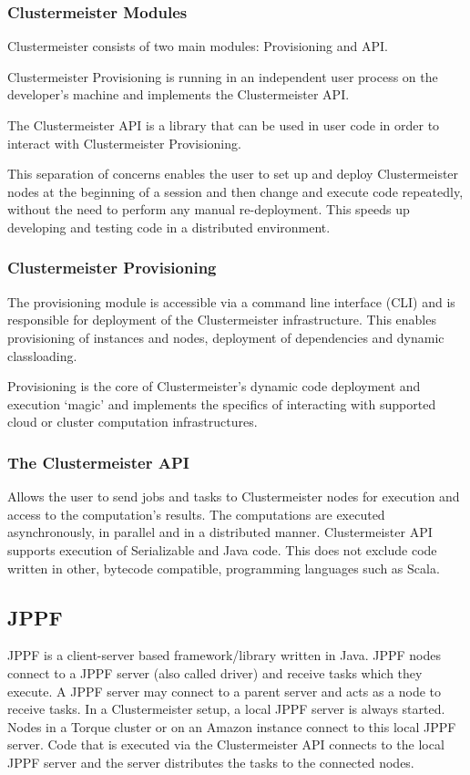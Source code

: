 \documentclass[english]{uzhpub}
\begin{document}
\subsubsection{Clustermeister Modules}

Clustermeister consists of two main modules: Provisioning and API.

Clustermeister Provisioning is running in an independent user process on the developer's machine and implements the Clustermeister API.

The Clustermeister API is a library that can be used in user code in order to interact with Clustermeister Provisioning. 

This separation of concerns enables the user to set up and deploy Clustermeister nodes at the beginning of a session and then change and execute code repeatedly, without the need to perform any manual re-deployment. This speeds up developing and testing code in a distributed environment.

\subsubsection{Clustermeister Provisioning}
The provisioning module is accessible via a command line interface (CLI) and is responsible for deployment of the Clustermeister infrastructure. This enables provisioning of instances and nodes, deployment of dependencies and dynamic classloading.

Provisioning is the core of Clustermeister's dynamic code deployment and execution `magic' and implements the specifics of interacting with supported cloud or cluster computation infrastructures.

\subsubsection{The Clustermeister API}
Allows the user to send jobs and tasks to Clustermeister nodes for execution and access to the computation's results. The computations are executed asynchronously, in parallel and in a distributed manner. Clustermeister API supports execution of Serializable and Java code. This does not exclude code written in other, bytecode compatible, programming languages such as Scala.

\subsection{JPPF}

JPPF is a client-server based framework/library written in Java. JPPF nodes connect to a JPPF server (also called driver) and receive tasks which they execute. A JPPF server may connect to a parent server and acts as a node to receive tasks. In a Clustermeister setup, a local JPPF server is always started. Nodes in a Torque cluster or on an Amazon instance connect to this local JPPF server. Code that is executed via the Clustermeister API connects to the local JPPF server and the server distributes the tasks to the connected nodes.
\end{document}
